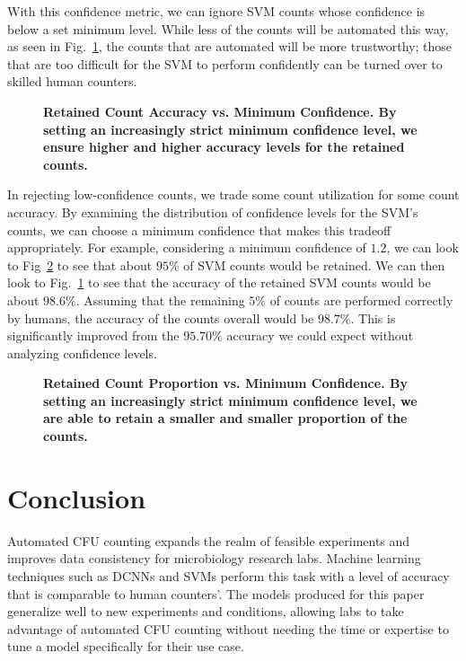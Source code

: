 \documentclass[10pt,letterpaper]{article}
\begin{document}
            With this confidence metric, we can ignore SVM counts whose confidence is below a set minimum level. While less of the counts will be automated this way, as seen in Fig.~\ref{svm_confidence_accuracy}, the counts that are automated will be more trustworthy; those that are too difficult for the SVM to perform confidently can be turned over to skilled human counters.
            
            \begin{figure}[h]
                
                \caption{{\bf Retained Count Accuracy vs. Minimum Confidence. By setting an increasingly strict minimum confidence level, we ensure higher and higher accuracy levels for the retained counts.}}
                \label{svm_confidence_accuracy}
            \end{figure}
            
            In rejecting low-confidence counts, we trade some count utilization for some count accuracy. By examining the distribution of confidence levels for the SVM's counts, we can choose a minimum confidence that makes this tradeoff appropriately. For example, considering a minimum confidence of $1.2$, we can look to Fig~\ref{svm_confidence_proportion} to see that about $95\%$ of SVM counts would be retained. We can then look to Fig.~\ref{svm_confidence_accuracy} to see that the accuracy of the retained SVM counts would be about $98.6\%$. Assuming that the remaining $5\%$ of counts are performed correctly by humans, the accuracy of the counts overall would be $98.7\%$. This is significantly improved from the $95.70\%$ accuracy we could expect without analyzing confidence levels.
            
            \begin{figure}[h]
                
                \caption{{\bf Retained Count Proportion vs. Minimum Confidence. By setting an increasingly strict minimum confidence level, we are able to retain a smaller and smaller proportion of the counts.}}
                \label{svm_confidence_proportion}
            \end{figure}

\section*{Conclusion}
    Automated CFU counting expands the realm of feasible experiments and improves data consistency for microbiology research labs. Machine learning techniques such as DCNNs and SVMs perform this task with a level of accuracy that is comparable to human counters'. The models produced for this paper generalize well to new experiments and conditions, allowing labs to take advantage of automated CFU counting without needing the time or expertise to tune a model specifically for their use case.
\end{document}
